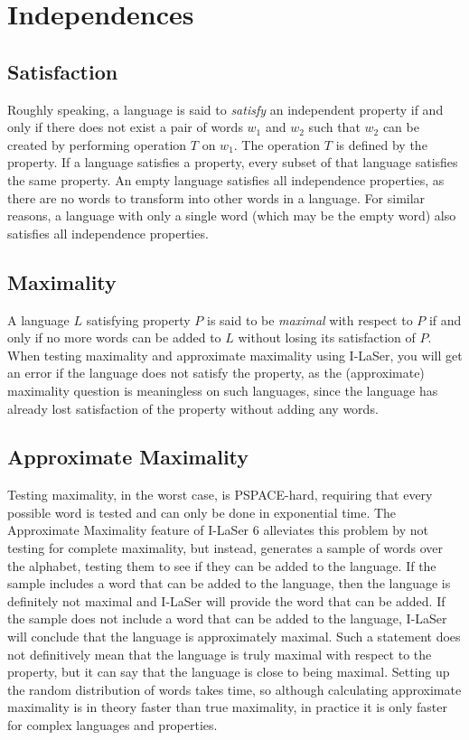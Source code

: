 \documentclass{article}
\begin{document}
\section{Independences}

\subsection{Satisfaction}
\par Roughly speaking, a language is said to \textit{satisfy} an independent property if and only if there does not exist a pair of words $w_1$ and $w_2$ such that $w_2$ can be created by performing operation $T$ on $w_1$. The operation $T$ is defined by the property. If a language satisfies a property, every subset of that language satisfies the same property. An empty language satisfies all independence properties, as there are no words to transform into other words in a language. For similar reasons, a language with only a single word (which may be the empty word) also satisfies all independence properties. 

\subsection{Maximality}
\par A language $L$ satisfying property $P$ is said to be \textit{maximal} with respect to $P$ if and only if no more words can be added to $L$ without losing its satisfaction of $P$. When testing maximality and approximate maximality using I-LaSer, you will get an error if the language does not satisfy the property, as the (approximate) maximality question is meaningless on such languages, since the language has already lost satisfaction of the property without adding any words. 

\subsection{Approximate Maximality}
\par Testing maximality, in the worst case, is PSPACE-hard, requiring that every possible word is tested and can only be done in exponential time.
The Approximate Maximality feature of I-LaSer 6 alleviates this problem by not testing for complete maximality, but instead, generates a sample of words over the alphabet, testing them to see if they can be added to the language. If the sample includes a word that can be added to the language, then the language is definitely not maximal and I-LaSer will provide the word that can be added. If the sample does not include a word that can be added to the language, I-LaSer will conclude that the language is approximately maximal. Such a statement does not definitively mean that the language is truly maximal with respect to the property, but it can say that the language is close to being maximal. Setting up the random distribution of words takes time, so although calculating approximate maximality is in theory faster than true maximality, in practice it is only faster for complex languages and properties. 
\end{document}
